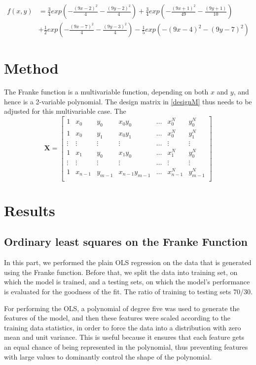 \documentclass{article}
\begin{document}
\begin{align*}
f(x,y) &= \frac{3}{4}exp\left(-\frac{(9x-2)^2}{4} - \frac{(9y-2)^2}{4}\right)+\frac{3}{4}exp\left(-\frac{(9x+1)^2}{49} - \frac{(9y+1)}{10}\right)\\
&+ \frac{1}{2}exp\left(-\frac{(9x-7)^2}{4} - \frac{(9y-3)^2}{4}\right)-\frac{1}{5}exp\left(-(9x-4)^2 - (9y-7)^2\right)
\end{align*}
\section{Method}
The Franke function is a multivariable function, depending on both $x$ and $y$, and hence is a 2-variable polynomial. The design matrix in \ref{designM} thus needs to be adjusted for this multivariable case. The 
$$\textbf{X} = \begin{bmatrix}
1 & x_{0} & y_{0} & x_{0}y_{0} & \dots & x_{0}^{N} & y_{0}^{N}     \\
1 & x_{0} & y_{1} & x_{0}y_{1} & \dots & x_{0}^{N} & y_{1}^{N}  \\
\vdots & \vdots & \vdots & \vdots & \dots & \vdots & \vdots \\
1 & x_{1} & y_{0} & x_{1}y_{0} & \dots & x_{1}^{N} & y_{0}^{N} \\
\vdots & \vdots & \vdots & \vdots & \dots & \vdots & \vdots \\
1 & x_{n-1} & y_{m-1} & x_{n-1}y_{m-1} & \dots & x_{n-1}^{N} & y_{m-1}^{N} \\
\end{bmatrix}$$
\section{Results}
\subsection{Ordinary least squares on the Franke Function}
In this part, we performed the plain OLS regression on the data that is generated using the Franke function. Before that, we split the data into training set, on which the model is trained, and a testing sets, on which the model’s performance is evaluated for the goodness of the fit. The ratio of training to testing sets 70/30.

For performing the OLS, a polynomial of degree five was used to generate the features of the model, and then these features were scaled according to the training data statistics, in order to force the data into a distribution with zero mean and unit variance. This is useful because it ensures that each feature gets an equal chance of being represented in the polynomial, thus preventing features with large values to dominantly control the shape of the polynomial.
\end{document}
